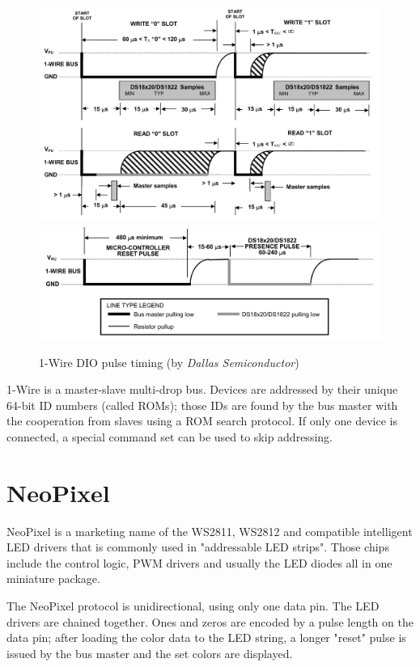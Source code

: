 \begin{figure}
\centering
\includegraphics[width=\textwidth] {img/1w-rw.png}
\includegraphics[width=\textwidth] {img/1w-reset.png}
\caption{\label{fig:1w-pulses}1-Wire DIO pulse timing (by \textit{Dallas Semiconductor})}
\end{figure}

1-Wire is a master-slave multi-drop bus. Devices are addressed by their unique 64-bit ID numbers (called ROMs); those IDs are found by the bus master with the cooperation from slaves using a ROM search protocol. If only one device is connected, a special command set can be used to skip addressing.

\section{NeoPixel}

NeoPixel is a marketing name of the WS2811, WS2812 and compatible intelligent LED drivers that is commonly used in "addressable LED strips". Those chips include the control logic, PWM drivers and usually the LED diodes all in one miniature package.

The NeoPixel protocol is unidirectional, using only one data pin. The LED drivers are chained together. Ones and zeros are encoded by a pulse length on the data pin; after loading the color data to the LED string, a longer "reset" pulse is issued by the bus master and the set colors are displayed.

